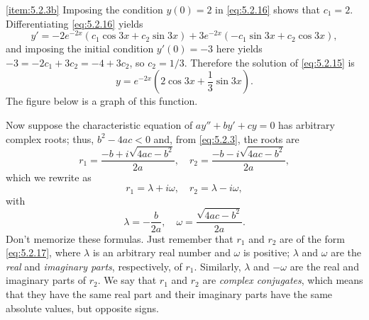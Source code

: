 \documentclass{ximera}
\begin{document}
\begin{example}
\begin{explanation}
\ref{item:5.2.3b}   Imposing the condition $y(0)=2$
in   \eqref{eq:5.2.16} shows that $c_1=2$.  Differentiating
\eqref{eq:5.2.16} yields
$$
y'=-2e^{-2x}(c_1\cos 3x+c_2\sin 3x) +3e^{-2x}(-c_1\sin 3x +c_2\cos 3x),
$$
and imposing the initial condition $y'(0)=-3$ here yields
$-3=-2c_1+3c_2=-4+3c_2$,
 so $c_2=1/3$. Therefore the solution of
\eqref{eq:5.2.15} is
$$
y=e^{-2x}(2\cos 3x+ \frac{1}{3}\sin 3x).
$$
The figure below is a graph of this function.

\begin{center}
\end{center}
 
\end{explanation}
\end{example}
 
 
Now suppose   the characteristic equation of $ay''+by'+cy=0$ has
arbitrary complex roots;   thus, $b^2-4ac<0$ and, from \eqref{eq:5.2.3},
the
roots are
$$
r_1 = \frac{-b+i\sqrt{4ac-b^2}}{2a},\quad r_2 =
\frac{-b-i\sqrt{4ac-b^2}}{2a},
$$
which we rewrite as
\begin{equation} \label{eq:5.2.17}
r_1=\lambda+i \omega,\quad r_2 = \lambda - i \omega,
\end{equation}
 with
$$
\lambda = -\frac{b}{2a},\quad \omega = \frac{\sqrt{4ac-b^2}}{2a}.
$$
Don't memorize these formulas. Just remember that $r_1$
and $r_2$ are of the form \eqref{eq:5.2.17},
where  $\lambda$ is an arbitrary real number and $\omega$
is   positive;
 $\lambda$ and $\omega$ are  the \textit{real}
and \textit{imaginary parts}, respectively, of $r_1$.
Similarly, $\lambda$ and $-\omega$ are the real and imaginary parts of
$r_2$. We say that $r_1$ and $r_2$ are \textit{complex conjugates},
which means that they have the same real part and their imaginary
parts have the same absolute values, but opposite signs.
 
\end{document}
